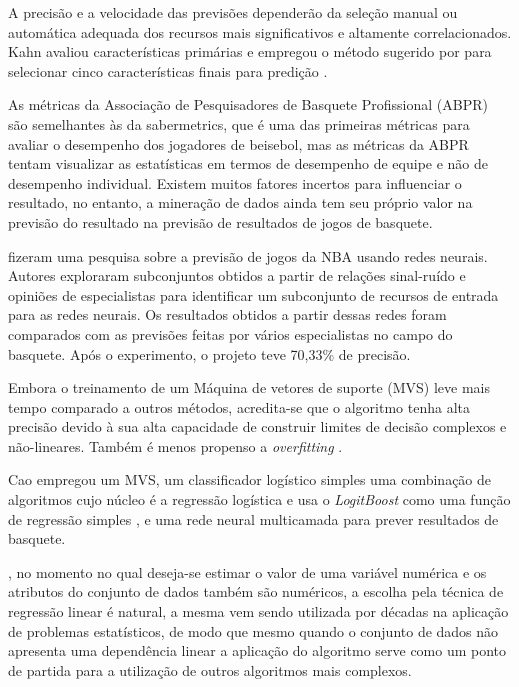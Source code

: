 A precisão e a velocidade das previsões dependerão da seleção manual ou automática adequada dos recursos mais significativos e altamente correlacionados. Kahn avaliou características primárias e empregou o método sugerido por \cite{Purucker1996} para selecionar cinco características finais para predição \cite{Kahn2003}.

As métricas da Associação de Pesquisadores de Basquete Profissional (ABPR) são semelhantes às da sabermetrics, que é uma das primeiras métricas para avaliar o desempenho dos jogadores de beisebol, mas as métricas da ABPR tentam visualizar as estatísticas em termos de desempenho de equipe e não de desempenho individual. Existem muitos fatores incertos para influenciar o resultado, no entanto, a mineração de dados ainda tem seu próprio valor na previsão do resultado na previsão de resultados de jogos de basquete.\cite{Schumaker2010}

 fizeram uma pesquisa sobre a previsão de jogos da NBA usando redes neurais. Autores exploraram subconjuntos obtidos a partir de relações sinal-ruído e opiniões de especialistas para identificar um subconjunto de recursos de entrada para as redes neurais. Os resultados obtidos a partir dessas redes foram comparados com as previsões feitas por vários especialistas no campo do basquete. Após o experimento, o projeto teve 70,33\% de precisão.

Embora o treinamento de um Máquina de vetores de suporte (MVS) leve mais tempo comparado a outros métodos, acredita-se que o algoritmo tenha alta precisão devido à sua alta capacidade de construir limites de decisão complexos e não-lineares. Também é menos propenso a \textit{overfitting} \cite{Han2017}. 

Cao empregou um MVS, um classificador logístico simples uma combinação de algoritmos cujo núcleo é a regressão logística e usa o \textit{LogitBoost} como uma função de regressão simples \cite{Landwehr2005}, e uma rede neural multicamada para prever resultados de basquete.

, no momento no qual deseja-se estimar o valor de uma variável numérica e os atributos do  conjunto de dados também são numéricos, a escolha pela técnica de regressão linear é natural, a mesma vem sendo utilizada por décadas na aplicação de problemas estatísticos, de modo que mesmo quando o conjunto de dados não apresenta uma dependência linear a aplicação do algoritmo serve como um ponto de partida para a utilização de outros algoritmos mais complexos.

